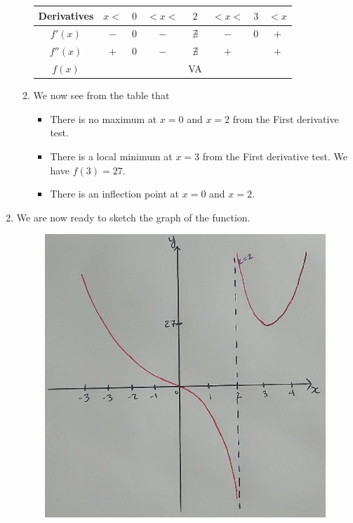 \begin{enumerate}[label=\textbf{\Alph*.}]
\begin{enumerate}[label=\textbf{(\Roman*)}]
	\begin{center}
	\begin{tabular}{c||c|c|c|c|c|c|c}
	Derivatives & \phantom{22} $x < $ \phantom{22} & $0$ & \phantom{22} $< x < $ \phantom{22} & $2$ & \phantom{22} $< x < $ \phantom{22} & $3$ & \phantom{22} $< x$ \phantom{22} \\\hline
	$f'(x)$ & $-$ & $0$ & $-$ & $\nexists$ & $-$ & $0$ & $+$
	\\
	$f''(x)$ & $+$ & $0$ & $-$ & $\nexists$ & $+$ &  & $+$ \\\hline
	$f(x)$ & \CVupDec &  & \CVdownDec  & VA & \CVupDec &  & \CVupInc
	\end{tabular}
	\end{center}
	\item We now see from the table that
		\begin{itemize}
		\item There is no maximum at $x = 0$ and $x = 2$ from the First derivative test.
		\item There is a local minimum at $x = 3$ from the First derivative test. We have $f(3) = 27$.
		\item There is an inflection point at $x = 0$ and $x = 2$. 
		\end{itemize}
	\end{enumerate}
	\item We are now ready to sketch the graph of the function.
		\begin{figure}[ht]
		\centering
		\includegraphics[scale=0.1842]{no20.png}
		\end{figure}
	\end{enumerate}
	
	
	

	